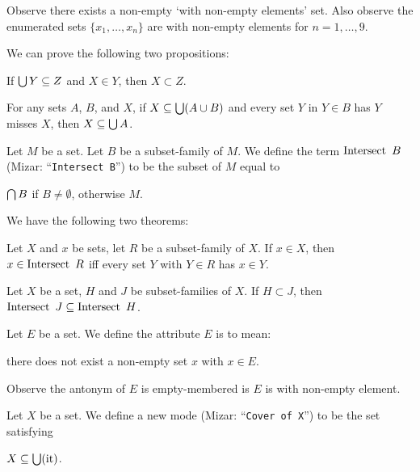 \documentclass{article}
\begin{document}
Observe there exists a non-empty `with non-empty elements' set.
Also observe the enumerated sets $\{x_{1},\dots,x_{n}\}$ are with
non-empty elements for $n=1,\dots,9$.

We can prove the following two propositions:
\begin{thm}
\item\label{setfam1:41} If $\bigcup Y\subseteq Z$ and $X\in Y$, then
  $X\subset Z$.
\item\label{setfam1:42} For any sets $A$, $B$, and $X$, if
  $X\subseteq\bigcup(A\cup B)$ and every set $Y$ in $Y\in B$ has $Y$ misses $X$,
  then $X\subseteq\bigcup A$.
\end{thm}

\begin{definition}
Let $M$ be a set. Let $B$ be a subset-family of $M$.
We define the term $\operatorname{Intersect}\ B$ (Mizar: ``\verb#Intersect B#'') to be
the subset of $M$ equal to
\begin{defn}
\item $\bigcap B$ if $B\neq\emptyset$, otherwise $M$.
\end{defn}
\end{definition}

We have the following two theorems:
\begin{thm}
\item\label{setfam1:43} Let $X$ and $x$ be sets, let $R$ be a
  subset-family of $X$. If $x\in X$, then $x\in\operatorname{Intersect}\ R$ iff every
  set $Y$ with $Y\in R$ has $x\in Y$.
\item\label{setfam1:44} Let $X$ be a set, $H$ and $J$ be subset-families
  of $X$. If $H\subset J$, then $\Intersect\ J\subset\Intersect\ H$.
\end{thm}

\begin{definition}
Let $E$ be a set. We define the attribute $E$ is 
to mean:
\begin{defn}
\item there does not exist a non-empty set $x$ with $x\in E$.
\end{defn}
\end{definition}

\begin{notation}
Observe the antonym of $E$ is empty-membered is $E$ is with non-empty element.
\end{notation}

\begin{definition}
Let $X$ be a set.
We define a new mode  (Mizar:
``\verb#Cover of X#'') to be the set satisfying
\begin{defn}
\item $X\subseteq\bigcup(\mbox{it})$.
\end{defn}
\end{definition}
\end{document}

